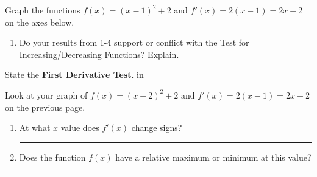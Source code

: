 \documentclass[11pt]{report}
\begin{document}
Graph the functions $f(x)=(x-1)^2+2$ and $f'(x)=2(x-1)=2x-2$ on the axes below.
\begin{multicols}{2}
\begin{enumerate}
\item Do your results from 1-4 support or conflict with the Test for Increasing/Decreasing Functions? Explain.
\end{enumerate} 
\end{multicols}

\newpage

State the \textbf{First Derivative Test}.  in

Look at your graph of $f(x)=(x-2)^2+2$ and $f'(x)=2(x-1)=2x-2$ on the previous page.
\begin{enumerate}
\item At what $x$ value does $f'(x)$ change signs?\rule{4 cm}{.4pt}
\item Does the function $f(x)$ have a relative maximum or minimum at this value?\rule{4 cm}{.4pt}
\end{enumerate}
\end{document}
